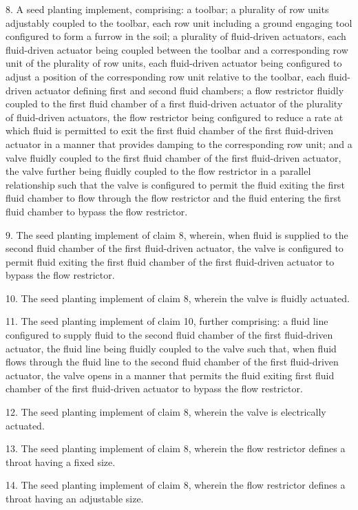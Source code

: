 \documentclass[11pt,a4paper]{article}
\begin{document}
8. A seed planting implement, comprising: a toolbar; a plurality of row units adjustably coupled to the toolbar, each row unit including a ground engaging tool configured to form a furrow in the soil; a plurality of fluid-driven actuators, each fluid-driven actuator being coupled between the toolbar and a corresponding row unit of the plurality of row units, each fluid-driven actuator being configured to adjust a position of the corresponding row unit relative to the toolbar, each fluid-driven actuator defining first and second fluid chambers; a flow restrictor fluidly coupled to the first fluid chamber of a first fluid-driven actuator of the plurality of fluid-driven actuators, the flow restrictor being configured to reduce a rate at which fluid is permitted to exit the first fluid chamber of the first fluid-driven actuator in a manner that provides damping to the corresponding row unit; and a valve fluidly coupled to the first fluid chamber of the first fluid-driven actuator, the valve further being fluidly coupled to the flow restrictor in a parallel relationship such that the valve is configured to permit the fluid exiting the first fluid chamber to flow through the flow restrictor and the fluid entering the first fluid chamber to bypass the flow restrictor.

9. The seed planting implement of claim 8, wherein, when fluid is supplied to the second fluid chamber of the first fluid-driven actuator, the valve is configured to permit fluid exiting the first fluid chamber of the first fluid-driven actuator to bypass the flow restrictor.

10. The seed planting implement of claim 8, wherein the valve is fluidly actuated.

11. The seed planting implement of claim 10, further comprising: a fluid line configured to supply fluid to the second fluid chamber of the first fluid-driven actuator, the fluid line being fluidly coupled to the valve such that, when fluid flows through the fluid line to the second fluid chamber of the first fluid-driven actuator, the valve opens in a manner that permits the fluid exiting first fluid chamber of the first fluid-driven actuator to bypass the flow restrictor.

12. The seed planting implement of claim 8, wherein the valve is electrically actuated.

13. The seed planting implement of claim 8, wherein the flow restrictor defines a throat having a fixed size.

14. The seed planting implement of claim 8, wherein the flow restrictor defines a throat having an adjustable size.
\end{document}
